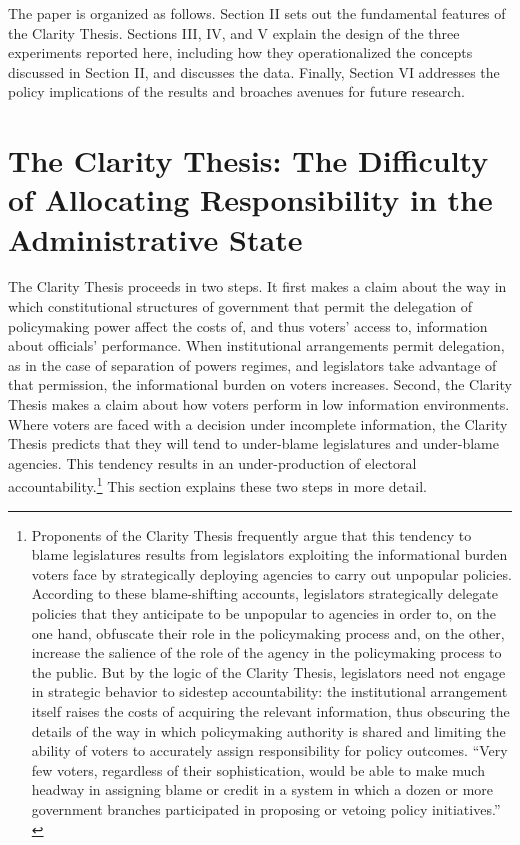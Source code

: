 \documentclass{article}
\begin{document}
The paper is organized as follows. Section II sets out the fundamental features of the Clarity Thesis. Sections III, IV, and V explain the design of the three experiments reported here, including how they operationalized the concepts discussed in Section II, and discusses the data. Finally, Section VI addresses the policy implications of the results and broaches avenues for future research. 

\section{The Clarity Thesis: The Difficulty of Allocating Responsibility in the Administrative State}

The Clarity Thesis proceeds in two steps. It first makes a claim about the way in which constitutional structures of government that permit the delegation of policymaking power affect the costs of, and thus voters' access to, information about officials' performance. When institutional arrangements permit delegation, as in the case of separation of powers regimes, and legislators take advantage of that permission, the informational burden on voters increases. Second, the Clarity Thesis makes a claim about how voters perform in low information environments. Where voters are faced with a decision under incomplete information, the Clarity Thesis predicts that they will tend to under-blame legislatures and under-blame agencies. This tendency results in an under-production of electoral accountability.\footnote{Proponents of the Clarity Thesis frequently argue that this tendency to blame legislatures results from legislators exploiting the informational burden voters face by strategically deploying agencies to carry out unpopular policies. According to these blame-shifting accounts, legislators strategically delegate policies that they anticipate to be unpopular to agencies in order to, on the one hand, obfuscate their role in the policymaking process and, on the other, increase the salience of the role of the agency in the policymaking process to the public. But by the logic of the Clarity Thesis, legislators need not engage in strategic behavior to sidestep accountability: the institutional arrangement itself raises the costs of acquiring the relevant information, thus obscuring the details of the way in which policymaking authority is shared and limiting the ability of voters to accurately assign responsibility for policy outcomes. ``Very few voters, regardless of their sophistication, would be able to make much headway in assigning blame or credit in a system in which a dozen or more government branches participated in proposing or vetoing policy initiatives.'' \citep[p. 653]{Nzelibe2010}} This section explains these two steps in more detail.
\end{document}
